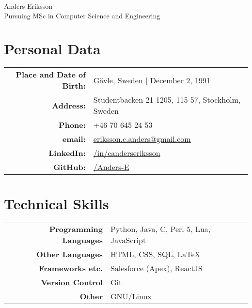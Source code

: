 \documentclass[a4paper,10pt]{article}
\begin{document}
\pagestyle{empty} %


\par{
    \centering
	{
	    \Huge \bitter Anders Eriksson \\
	    \normalfont
	    \normalsize Pursuing MSc in Computer Science and Engineering
	}
	\bigskip\par
}

\section{Personal Data}

\begin{tabular}{rl}
    \textbf{Place and Date of Birth:} & Gävle, Sweden  | December 2, 1991 \\
    \textbf{Address:}   & Studentbacken 21-1205, 115 57, Stockholm, Sweden \\
    \textbf{Phone:}     & +46 70 645 24 53\\
    \textbf{email:}     & \href{mailto:eriksson.c.anders@gmail.com
}{eriksson.c.anders@gmail.com}\\
    \textbf{LinkedIn:}	& \href{http://se.linkedin.com/in/canderseriksson}{/in/canderseriksson}\\
    \textbf{GitHub:}	& \href{http://github.com/Anders-E}{/Anders-E}
\end{tabular}

\section{Technical Skills}
\begin{tabular}{r|l}
\textbf{Programming Languages} & Python, Java, C, Perl 5, Lua, JavaScript \\
\textbf{Other Languages} & HTML, CSS, SQL, \LaTeX \\
\textbf{Frameworks etc.} & Salesforce (Apex), ReactJS \\
\textbf{Version Control} & Git \\
\textbf{Other} & GNU/Linux\\
\end{tabular}
\end{document}
